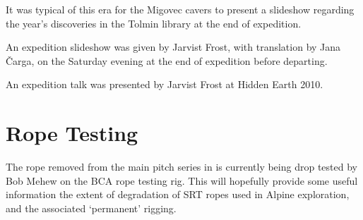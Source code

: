     \begin{marginfigure}
\checkoddpage \ifoddpage \forcerectofloat \else \forceversofloat \fi
\centering
 \caption{It was typical of this era for the Migovec cavers to present a slideshow regarding the year's discoveries in the Tolmin library at the end of expedition. }
 \label{Tolmin slideshow 2009}
\end{marginfigure}

An expedition slideshow was given by Jarvist Frost, with translation by Jana Čarga, on the Saturday evening at the end of expedition before departing.

An expedition talk was presented by Jarvist Frost at Hidden Earth 2010.




\section{Rope Testing}

The rope removed from the main pitch series in  is currently being
drop tested by Bob Mehew on the BCA rope testing rig. This will hopefully provide some useful information the extent of degradation of SRT ropes used in
Alpine exploration, and the associated `permanent' rigging.
